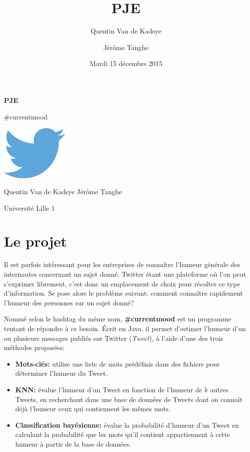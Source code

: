 \documentclass[12pt,a4paper]{report}
\title{PJE\\\CMName}
\author{Quentin Van de Kadsye \and Jérôme Tanghe}
\date{Mardi 15 décembre 2015}
\newcommand{\CMName}{\#currentmood}
\begin{document}
{}
\begin{titlepage}
	\centering
	{%
		\Huge

		\textbf{PJE}

		\CMName%

		\vfill

		\includegraphics[width=0.25\textwidth]{img/TwitterLogo.eps}

		\Large
		\vfill

		Quentin Van de Kadsye
		\hspace{2cm}
		Jérôme Tanghe

		\vfill
		Université Lille 1
	}
\end{titlepage}


\setcounter{tocdepth}{1}
\tableofcontents


\chapter{Le projet}

Il est parfois intéressant pour les entreprises de connaître l'humeur générale
des internautes concernant un sujet donné. Twitter étant une plateforme où l'on peut
s'exprimer librement, c'est donc un emplacement de choix pour récolter ce type
d'information. Se pose alors le problème suivant: comment connaître rapidement
l'humeur des personnes sur un sujet donné?

Nommé selon le hashtag du même nom, \textbf{\CMName} est un programme tentant de
répondre à ce besoin. Écrit en Java, il permet d'estimer l'humeur d'un ou
plusieurs messages publiés sur Twitter (\textit{Tweet}), à l'aide d'une des trois méthodes proposées:

\begin{itemize}
	\item
		\textbf{Mots-clés:} utilise une liste de mots prédéfinis dans des
		fichiers pour déterminer l'humeur du Tweet.
	\item
		\textbf{KNN:} évalue l'humeur d'un Tweet en fonction de l'humeur de $k$
		autres Tweets, en recherchant dans une base de données de Tweets dont on
		connaît déjà l'humeur ceux qui contiennent les mêmes mots.
	\item
		\textbf{Classification bayésienne:} évalue la probabilité d'humeur d'un
		Tweet en calculant la probabilité que les mots qu'il contient
		appartiennent à cette humeur à partir de la base de données.
\end{itemize}
\end{document}
